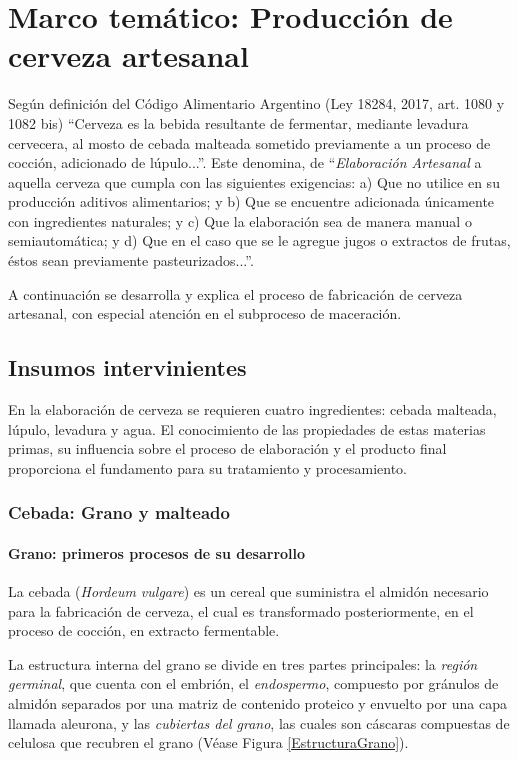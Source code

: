 \chapter{ Marco temático: Producción de cerveza artesanal}
    
    \par Según definición del Código Alimentario Argentino (Ley 18284, 2017, art. 1080 y 1082 bis) “Cerveza es la bebida resultante de fermentar, mediante levadura cervecera, al mosto de cebada malteada sometido previamente a un proceso de cocción, adicionado de lúpulo...”. Este denomina, de “\textit{Elaboración Artesanal} a aquella cerveza que cumpla con las siguientes exigencias: a) Que no utilice en su producción aditivos alimentarios; y b) Que se encuentre adicionada únicamente con ingredientes naturales; y c) Que la elaboración sea de manera manual o semiautomática; y d) Que en el caso que se le agregue jugos o extractos de frutas, éstos sean previamente pasteurizados...”. 
    
    \par A continuación se desarrolla y explica el proceso de fabricación de cerveza artesanal, con especial atención en el subproceso de maceración.
    
    \section{Insumos intervinientes}
        \par En la elaboración de cerveza se requieren cuatro ingredientes: cebada malteada, lúpulo, levadura y agua. El conocimiento de las propiedades de estas materias primas, su influencia sobre el proceso de elaboración y el producto final proporciona el fundamento para su tratamiento  y  procesamiento.
        
        
    	
        \subsection{Cebada: Grano y malteado}
            \subsubsection{Grano: primeros procesos de su desarrollo}
                \par La cebada (\textit{Hordeum vulgare}) es un cereal que suministra el almidón necesario para la fabricación de cerveza, el cual es transformado posteriormente, en el proceso de cocción, en extracto fermentable.
                \par La estructura interna del grano se divide en tres partes principales: la \textit{región germinal}, que cuenta con el embrión, el \textit{endospermo}, compuesto por gránulos de almidón separados por una matriz de contenido proteico y envuelto por una capa llamada aleurona, y las \textit{cubiertas del grano}, las cuales son cáscaras compuestas de celulosa que recubren el grano (Véase Figura \ref{EstructuraGrano}).
        
